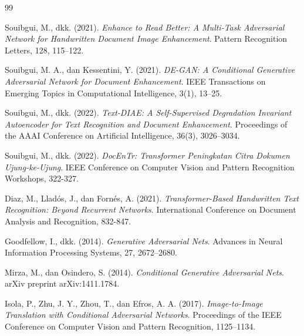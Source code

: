 \documentclass[12pt,a4paper]{book}
\begin{document}
\begin{thebibliography}{99}
\setlength{\itemsep}{0.2cm}

\setlength{\itemsep}{0.2cm}


Souibgui, M., dkk. (2021).
\textit{Enhance to Read Better: A Multi-Task Adversarial Network for Handwritten Document Image Enhancement}.
Pattern Recognition Letters, 128, 115--122.

Souibgui, M. A., dan Kessentini, Y. (2021).
\textit{DE-GAN: A Conditional Generative Adversarial Network for Document Enhancement}.
IEEE Transactions on Emerging Topics in Computational Intelligence, 3(1), 13--25.

Souibgui, M., dkk. (2022).
\textit{Text-DIAE: A Self-Supervised Degradation Invariant Autoencoder for Text Recognition and Document Enhancement}.
Proceedings of the AAAI Conference on Artificial Intelligence, 36(3), 3026--3034.

Souibgui, M., dkk. (2022).
\textit{DocEnTr: Transformer Peningkatan Citra Dokumen Ujung-ke-Ujung}.
IEEE Conference on Computer Vision and Pattern Recognition Workshops, 322-327.

Diaz, M., Lladós, J., dan Fornés, A. (2021).
\textit{Transformer-Based Handwritten Text Recognition: Beyond Recurrent Networks}.
International Conference on Document Analysis and Recognition, 832-847.


Goodfellow, I., dkk. (2014).
\textit{Generative Adversarial Nets}.
Advances in Neural Information Processing Systems, 27, 2672--2680.

Mirza, M., dan Osindero, S. (2014).
\textit{Conditional Generative Adversarial Nets}.
arXiv preprint arXiv:1411.1784.

Isola, P., Zhu, J. Y., Zhou, T., dan Efros, A. A. (2017).
\textit{Image-to-Image Translation with Conditional Adversarial Networks}.
Proceedings of the IEEE Conference on Computer Vision and Pattern Recognition, 1125--1134.


\end{thebibliography}
\end{document}
